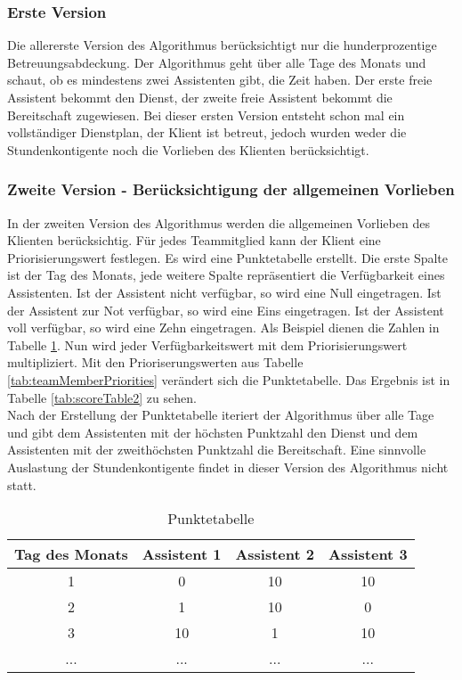 \documentclass[12pt,a4paper,titlepage]{article} %
\begin{document}
\subsubsection{Erste Version}
Die allererste Version des Algorithmus berücksichtigt nur die hunderprozentige Betreuungsabdeckung. Der Algorithmus geht über alle Tage des Monats und schaut, ob es mindestens zwei Assistenten gibt, die Zeit haben. Der erste freie Assistent bekommt den Dienst, der zweite freie Assistent bekommt die Bereitschaft zugewiesen. Bei dieser ersten Version entsteht schon mal ein vollständiger Dienstplan, der Klient ist betreut, jedoch wurden weder die Stundenkontigente noch die Vorlieben des Klienten berücksichtigt.

\subsubsection{Zweite Version - Berücksichtigung der allgemeinen Vorlieben}
\label{sec:secondVersion}

In der zweiten Version des Algorithmus werden die allgemeinen Vorlieben des Klienten berücksichtig. Für jedes Teammitglied kann der Klient eine Priorisierungswert festlegen. 
Es wird eine Punktetabelle erstellt. Die erste Spalte ist der Tag des Monats, jede weitere Spalte repräsentiert die Verfügbarkeit eines Assistenten. Ist der Assistent nicht verfügbar, so wird eine Null eingetragen. Ist der Assistent zur Not verfügbar, so wird eine Eins eingetragen. Ist der Assistent voll verfügbar, so wird eine Zehn eingetragen. Als Beispiel dienen die Zahlen in Tabelle \ref{tab:scoreTable}. Nun wird jeder Verfügbarkeitswert mit dem Priorisierungswert multipliziert. Mit den Prioriserungswerten  aus Tabelle \ref{tab:teamMemberPriorities} verändert sich die Punktetabelle. Das Ergebnis ist in Tabelle \ref{tab:scoreTable2} zu sehen. \\
Nach der Erstellung der Punktetabelle iteriert der Algorithmus über alle Tage und gibt dem Assistenten mit der höchsten Punktzahl den Dienst und dem Assistenten mit der zweithöchsten Punktzahl die Bereitschaft.
Eine sinnvolle Auslastung der Stundenkontigente findet in dieser Version des Algorithmus nicht statt.

\begin{table}[htb]
\centering
\begin{tabular}{|c|c|c|c|}
\hline 
Tag des Monats & Assistent 1 & Assistent 2 & Assistent 3 \\ 
\hline 
1 & 0 & 10 & 10 \\ 
\hline 
2 & 1 & 10 & 0 \\ 
\hline 
3 & 10 & 1 & 10 \\ 
\hline 
... & ... & ... & ... \\ 
\hline 
\end{tabular} 
\caption{Punktetabelle}
\label{tab:scoreTable}
\end{table}
\end{document}
